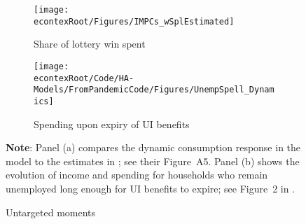 \documentclass[\econtexRoot/HAFiscal]{subfiles}
\begin{document}
\begin{figure}[htb]
    \centering
    \begin{subfigure}[b]{.48\linewidth}
        \centering
        \texttt{[image: \\econtexRoot/Figures/IMPCs\_wSplEstimated]}
        \caption{Share of lottery win spent}
        \notinsubfile{\label{fig:USaggmpclotterywin}}
    \end{subfigure}%
    \begin{subfigure}[b]{.48\linewidth}
        \centering
        \texttt{[image: \\econtexRoot/Code/HA-Models/FromPandemicCode/Figures/UnempSpell\_Dynamics]}
        \caption{Spending upon expiry of UI benefits}
        \notinsubfile{\label{fig:expiryUI}}
    \end{subfigure}
    \caption{Untargeted moments}
    \notinsubfile{\label{fig:untargetedMoments}}
    \parbox{16cm}{\small \vspace{.15cm} \textbf{Note}: Panel (a) compares the dynamic consumption response in the model to the estimates in \citet{fagereng_mpc_2021}; see their Figure~A5.
Panel (b) shows the evolution of income and spending for households who remain unemployed long enough for UI benefits to expire; see Figure~2 in \citet{ganongConsumer2019}.\normalsize}
  \end{figure}
  
\end{document}
